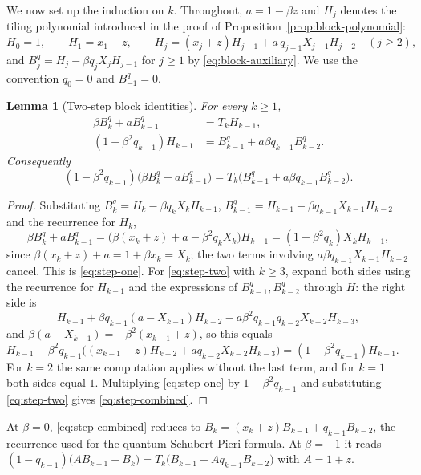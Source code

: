 \documentclass[11pt]{article}
\newtheorem{lemma}[proposition]{Lemma}
\begin{document}
We now set up the induction on $k$. Throughout, $a=1-\beta z$ and
$H_j$ denotes the tiling polynomial introduced in the proof of
Proposition~\ref{prop:block-polynomial}:
\[
 H_0=1,\qquad H_1=x_1+z,\qquad
 H_j=(x_j+z)H_{j-1}+a\,q_{j-1}X_{j-1}H_{j-2}\quad(j\geq2),
\]
and $B_j^q=H_j-\beta q_jX_jH_{j-1}$ for $j\geq1$ by
\eqref{eq:block-auxiliary}. We use the convention $q_0=0$ and
$B_{-1}^q=0$.

\begin{lemma}[Two-step block identities]\label{lem:two-step}
For every $k\geq1$,
\begin{align}
 \beta B_k^q+aB_{k-1}^q&=T_kH_{k-1},\label{eq:step-one}\\
 (1-\beta^2q_{k-1})H_{k-1}&=B_{k-1}^q+a\beta q_{k-1}B_{k-2}^q.
 \label{eq:step-two}
\end{align}
Consequently
\begin{equation}\label{eq:step-combined}
 (1-\beta^2q_{k-1})\bigl(\beta B_k^q+aB_{k-1}^q\bigr)
 =T_k\bigl(B_{k-1}^q+a\beta q_{k-1}B_{k-2}^q\bigr).
\end{equation}
\end{lemma}

\begin{proof}
Substituting $B_k^q=H_k-\beta q_kX_kH_{k-1}$,
$B_{k-1}^q=H_{k-1}-\beta q_{k-1}X_{k-1}H_{k-2}$ and the recurrence for
$H_k$,
\[
 \beta B_k^q+aB_{k-1}^q
 =\bigl(\beta(x_k+z)+a-\beta^2q_kX_k\bigr)H_{k-1}
 =(1-\beta^2q_k)X_kH_{k-1},
\]
since $\beta(x_k+z)+a=1+\beta x_k=X_k$; the two terms involving
$a\beta q_{k-1}X_{k-1}H_{k-2}$ cancel. This is \eqref{eq:step-one}.
For \eqref{eq:step-two} with $k\geq3$, expand both sides using the
recurrence for $H_{k-1}$ and the expressions of $B_{k-1}^q,B_{k-2}^q$
through $H$: the right side is
\[
 H_{k-1}+\beta q_{k-1}(a-X_{k-1})H_{k-2}
   -a\beta^2q_{k-1}q_{k-2}X_{k-2}H_{k-3},
\]
and $\beta(a-X_{k-1})=-\beta^2(x_{k-1}+z)$, so this equals
$H_{k-1}-\beta^2q_{k-1}\bigl((x_{k-1}+z)H_{k-2}+aq_{k-2}X_{k-2}H_{k-3}\bigr)
=(1-\beta^2q_{k-1})H_{k-1}$. For $k=2$ the same computation applies
without the last term, and for $k=1$ both sides equal $1$.
Multiplying \eqref{eq:step-one} by $1-\beta^2q_{k-1}$ and
substituting \eqref{eq:step-two} gives \eqref{eq:step-combined}.
\end{proof}

At $\beta=0$, \eqref{eq:step-combined} reduces to
$B_k=(x_k+z)B_{k-1}+q_{k-1}B_{k-2}$, the recurrence used for the
quantum Schubert Pieri formula. At $\beta=-1$ it reads
$(1-q_{k-1})\bigl(AB_{k-1}-B_k\bigr)=T_k\bigl(B_{k-1}-Aq_{k-1}B_{k-2}\bigr)$
with $A=1+z$.
\end{document}
